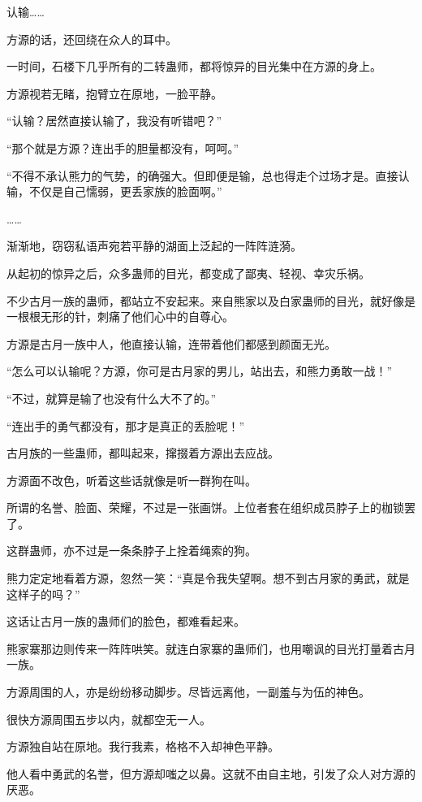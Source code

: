 
\begin{this_body}

认输……

方源的话，还回绕在众人的耳中。

一时间，石楼下几乎所有的二转蛊师，都将惊异的目光集中在方源的身上。

方源视若无睹，抱臂立在原地，一脸平静。

“认输？居然直接认输了，我没有听错吧？”

“那个就是方源？连出手的胆量都没有，呵呵。”

“不得不承认熊力的气势，的确强大。但即便是输，总也得走个过场才是。直接认输，不仅是自己懦弱，更丢家族的脸面啊。”

……

渐渐地，窃窃私语声宛若平静的湖面上泛起的一阵阵涟漪。

从起初的惊异之后，众多蛊师的目光，都变成了鄙夷、轻视、幸灾乐祸。

不少古月一族的蛊师，都站立不安起来。来自熊家以及白家蛊师的目光，就好像是一根根无形的针，刺痛了他们心中的自尊心。

方源是古月一族中人，他直接认输，连带着他们都感到颜面无光。

“怎么可以认输呢？方源，你可是古月家的男儿，站出去，和熊力勇敢一战！”

“不过，就算是输了也没有什么大不了的。”

“连出手的勇气都没有，那才是真正的丢脸呢！”

古月族的一些蛊师，都叫起来，撺掇着方源出去应战。

方源面不改色，听着这些话就像是听一群狗在叫。

所谓的名誉、脸面、荣耀，不过是一张画饼。上位者套在组织成员脖子上的枷锁罢了。

这群蛊师，亦不过是一条条脖子上拴着绳索的狗。

熊力定定地看着方源，忽然一笑：“真是令我失望啊。想不到古月家的勇武，就是这样子的吗？”

这话让古月一族的蛊师们的脸色，都难看起来。

熊家寨那边则传来一阵阵哄笑。就连白家寨的蛊师们，也用嘲讽的目光打量着古月一族。

方源周围的人，亦是纷纷移动脚步。尽皆远离他，一副羞与为伍的神色。

很快方源周围五步以内，就都空无一人。

方源独自站在原地。我行我素，格格不入却神色平静。

他人看中勇武的名誉，但方源却嗤之以鼻。这就不由自主地，引发了众人对方源的厌恶。


\end{this_body}
